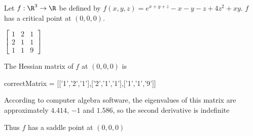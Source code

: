 \documentclass{ximera}
\begin{document}
	\begin{question}
		Let $f:\R^3 \to \R$ be defined by $f(x,y,z) = e^{x+y+z}  - x - y - z+ 4z^2+xy$.  $f$ has a critical point at $(0,0,0)$.
		\begin{solution}
			\begin{hint}
				\begin{question}
					\begin{solution}
						\begin{hint}
							\(
								\begin{bmatrix}
									1 &2 &1\\
									2& 1&1\\
									1&1&9
								\end{bmatrix}
							\)
						\end{hint}
						The Hessian matrix of $f$ at $(0,0,0)$ is
						\begin{matrix-answer}
							correctMatrix = [['1','2','1'],['2','1','1'],['1','1','9']]
						\end{matrix-answer}
					\end{solution}
				\end{question}
			\end{hint}
			\begin{hint}
				According to computer algebra software, the eigenvalues of this matrix are  approximately $4.414$, $-1$ and $1.586$, so the second derivative
				is indefinite
			\end{hint}
			\begin{hint}
				Thus $f$ has a saddle point at $(0,0,0)$
			\end{hint}
			\begin{multiple-choice}
			\end{multiple-choice}
		\end{solution}
	\end{question}
	
\end{document}
